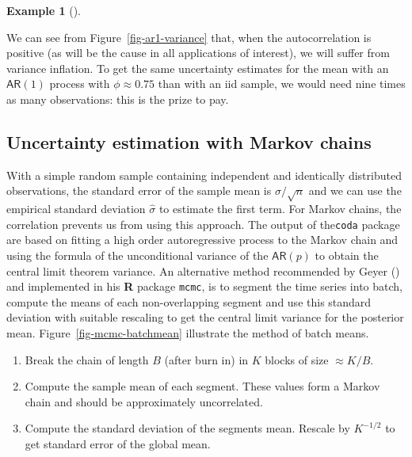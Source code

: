 \documentclass[
  11pt,
  letterpaper,
]{scrbook}
\providecommand{\tightlist}{%
  \setlength{\itemsep}{0pt}\setlength{\parskip}{0pt}}\usepackage{longtable,booktabs,array}
\theoremstyle{definition}
\theoremstyle{definition}
\newtheorem{example}{Example}[chapter]
\theoremstyle{definition}
\theoremstyle{plain}
\theoremstyle{plain}
\theoremstyle{remark}
\begin{document}
\begin{example}[]
\begin{figure}[ht!]
\end{figure}%

We can see from Figure~\ref{fig-ar1-variance} that, when the
autocorrelation is positive (as will be the cause in all applications of
interest), we will suffer from variance inflation. To get the same
uncertainty estimates for the mean with an \(\mathsf{AR}(1)\) process
with \(\phi \approx 0.75\) than with an iid sample, we would need nine
times as many observations: this is the prize to pay.

\end{example}

\subsection{Uncertainty estimation with Markov
chains}\label{uncertainty-estimation-with-markov-chains}

With a simple random sample containing independent and identically
distributed observations, the standard error of the sample mean is
\(\sigma/\sqrt{n}\) and we can use the empirical standard deviation
\(\widehat{\sigma}\) to estimate the first term. For Markov chains, the
correlation prevents us from using this approach. The output of
the\texttt{coda} package are based on fitting a high order
autoregressive process to the Markov chain and using the formula of the
unconditional variance of the \(\mathsf{AR}(p)\) to obtain the central
limit theorem variance. An alternative method recommended by Geyer
() and implemented in his \textbf{R}
package \texttt{mcmc}, is to segment the time series into batch, compute
the means of each non-overlapping segment and use this standard
deviation with suitable rescaling to get the central limit variance for
the posterior mean. Figure~\ref{fig-mcmc-batchmean} illustrate the
method of batch means.

\begin{enumerate}
\def\labelenumi{\arabic{enumi}.}
\tightlist
\item
  Break the chain of length \(B\) (after burn in) in \(K\) blocks of
  size \(\approx K/B\).
\item
  Compute the sample mean of each segment. These values form a Markov
  chain and should be approximately uncorrelated.
\item
  Compute the standard deviation of the segments mean. Rescale by
  \(K^{-1/2}\) to get standard error of the global mean.
\end{enumerate}
\end{document}
